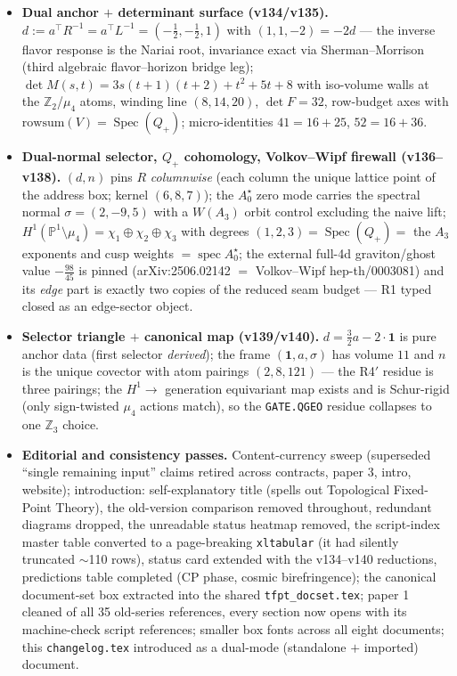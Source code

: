 \documentclass[11pt]{article}
\begin{document}
\begin{itemize}
  reduced seam route carries pure anchor ratios ($-\tfrac43$ $=$ minus the seed gain), the
  naive 4d route ($-\tfrac{109}{45}$) carries no atom (v133).
\item \textbf{Dual anchor $+$ determinant surface (v134/v135).} $d:=a^\top R^{-1}=a^\top
  L^{-1}=(-\tfrac12,-\tfrac12,1)$ with $(1,1,-2)=-2d$ --- the inverse flavor response is the
  Nariai root, invariance exact via Sherman--Morrison (third algebraic flavor--horizon bridge
  leg); $\det M(s,t)=3s(t{+}1)(t{+}2)+t^2+5t+8$ with iso-volume walls at the $\mathbb
  Z_2$/$\mu_4$ atoms, winding line $(8,14,20)$, $\det F=32$, row-budget axes with
  $\mathrm{rowsum}(V)=\operatorname{Spec}(Q_+)$; micro-identities $41=16+25$, $52=16+36$.
\item \textbf{Dual-normal selector, $Q_+$ cohomology, Volkov--Wipf firewall (v136--v138).}
  $(d,n)$ pins $R$ \emph{columnwise} (each column the unique lattice point of the address
  box; kernel $(6,8,7)$); the $A_0^\star$ zero mode carries the spectral normal
  $\sigma=(2,-9,5)$ with a $W(A_3)$ orbit control excluding the naive lift;
  $H^1(\mathbb P^1\setminus\mu_4)=\chi_1\oplus\chi_2\oplus\chi_3$ with degrees
  $(1,2,3)=\operatorname{Spec}(Q_+)=$ the $A_3$ exponents and cusp weights
  $=\operatorname{spec}A_0^\star$; the external full-4d graviton/ghost value $-\tfrac{98}{45}$
  is pinned (arXiv:2506.02142 $=$ Volkov--Wipf hep-th/0003081) and its \emph{edge} part is
  exactly two copies of the reduced seam budget --- R1 typed closed as an edge-sector object.
\item \textbf{Selector triangle $+$ canonical map (v139/v140).} $d=\tfrac32a-2\cdot\mathbf 1$
  is pure anchor data (first selector \emph{derived}); the frame $(\mathbf 1,a,\sigma)$ has
  volume $11$ and $n$ is the unique covector with atom pairings $(2,8,121)$ --- the R4$'$
  residue is three pairings; the $H^1\to$ generation equivariant map exists and is
  Schur-rigid (only sign-twisted $\mu_4$ actions match), so the \texttt{GATE.QGEO} residue
  collapses to one $\mathbb Z_3$ choice.
\item \textbf{Editorial and consistency passes.} Content-currency sweep (superseded
  ``single remaining input'' claims retired across contracts, paper 3, intro, website);
  introduction: self-explanatory title (spells out Topological Fixed-Point Theory), the
  old-version comparison removed throughout, redundant diagrams dropped, the unreadable
  status heatmap removed, the script-index master table converted to a page-breaking
  \texttt{xltabular} (it had silently truncated $\sim$110 rows), status card extended with
  the v134--v140 reductions, predictions table completed (CP phase, cosmic birefringence);
  the canonical document-set box extracted into the shared \texttt{tfpt\_docset.tex}; paper 1
  cleaned of all 35 old-series references, every section now opens with its machine-check
  script references; smaller box fonts across all eight documents; this \texttt{changelog.tex}
  introduced as a dual-mode (standalone $+$ imported) document.
\end{itemize}
\end{document}
